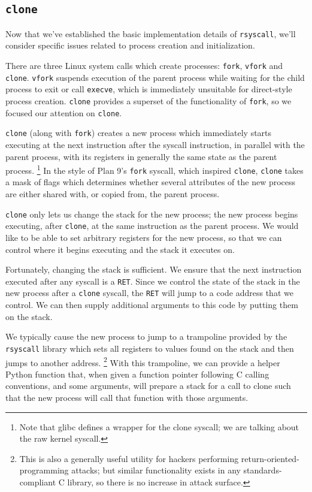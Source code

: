 \documentclass[sigplan]{acmart}
\begin{document}
\subsection{\texttt{clone}}\label{clone}
Now that we've established the basic implementation details of \texttt{rsyscall},
we'll consider specific issues related to process creation and initialization.

There are three Linux system calls which create processes:
\texttt{fork}, \texttt{vfork} and \texttt{clone}.
\texttt{vfork} suspends execution of the parent process
while waiting for the child process to exit or call \texttt{execve},
which is immediately unsuitable for direct-style process creation.
\texttt{clone} provides a superset of the functionality of \texttt{fork},
so we focused our attention on \texttt{clone}.

\texttt{clone} (along with \texttt{fork}) creates a new process
which immediately starts executing at the next instruction after the syscall instruction,
in parallel with the parent process,
with its registers in generally the same state as the parent process.
\footnote{Note that glibc defines a wrapper for the clone syscall;
we are talking about the raw kernel syscall.}
In the style of Plan 9's \texttt{fork} syscall\cite{rfork}, which inspired \texttt{clone},
\texttt{clone} takes a mask of flags which determines whether several attributes of the new process
are either shared with, or copied from, the parent process.

\texttt{clone} only lets us change the stack for the new process;
the new process begins executing, after \texttt{clone}, at the same instruction as the parent process.
We would like to be able to set arbitrary registers for the new process,
so that we can control where it begins executing and the stack it executes on.

Fortunately, changing the stack is sufficient.
We ensure that the next instruction executed after any syscall is a \texttt{RET}.
Since we control the state of the stack in the new process after a \texttt{clone} syscall,
the \texttt{RET} will jump to a code address that we control.
We can then supply additional arguments to this code
by putting them on the stack.

We typically cause the new process to jump to a trampoline provided by the \texttt{rsyscall} library
which sets all registers to values found on the stack
and then jumps to another address.
\footnote{This is also a generally useful utility for hackers performing return-oriented-programming attacks;
but similar functionality exists in any standards-compliant C library,
so there is no increase in attack surface.}
With this trampoline,
we can provide a helper Python function that,
when given a function pointer following C calling conventions, and some arguments,
will prepare a stack for a call to clone such that the new process will call that function with those arguments.
\end{document}

